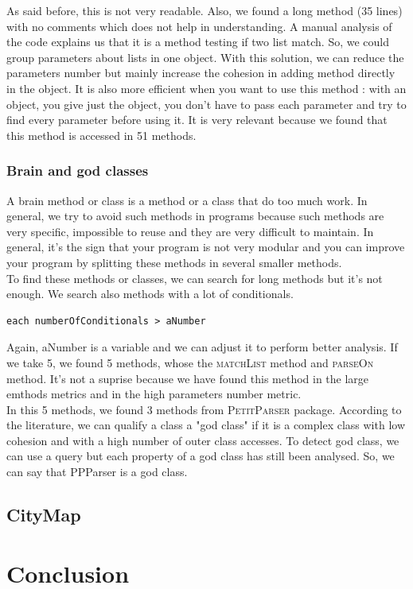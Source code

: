 As said before, this is not very readable.  Also, we found a long method (35 lines) with no comments which does not help in understanding.  A manual analysis of the code explains us that it is a method testing if two list match.  So, we could group parameters about lists in one object.  With this solution, we can reduce the parameters number but mainly increase the cohesion in adding method directly in the object.  It is also more efficient when you want to use this method : with an object, you give just the object, you don't have to pass each parameter and try to find every parameter before using it. It is very relevant because we found that this method is accessed in 51 methods.\\

\subsubsection{Brain and god classes}
A brain method or class is a method or a class that do too much work.  In general, we try to avoid such methods in programs because such methods are very specific, impossible to reuse and they are very difficult to maintain. In general, it's the sign that your program is not very modular and you can improve your program by splitting these methods in several smaller methods.\\
To find these methods or classes, we can search for long methods but it's not enough.  We search also methods with a lot of conditionals.\\ 
\begin{lstlisting}
each numberOfConditionals > aNumber
\end{lstlisting}
Again, aNumber is a variable and we can adjust it to perform better analysis.  If we take 5, we found 5 methods, whose the \textsc{matchList} method and \textsc{parseOn} method.  It's not a suprise because we have found this method in the large emthods metrics and in the high parameters number metric.\\
In this 5 methods, we found 3 methods from \textsc{PetitParser} package. According to the literature, we can qualify a class a "god class" if it is a complex class with low cohesion and with a high number of outer class accesses.
To detect god class, we can use a query but each property of a god class has still been analysed.  So, we can say that PPParser is a god class.\\


\subsection{CityMap}

\section{Conclusion}



